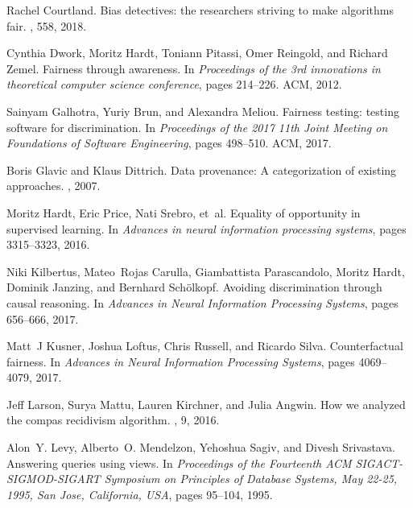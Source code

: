 Rachel Courtland.
\newblock Bias detectives: the researchers striving to make algorithms fair.
, 558, 2018.

Cynthia Dwork, Moritz Hardt, Toniann Pitassi, Omer Reingold, and Richard Zemel.
\newblock Fairness through awareness.
\newblock In {\em Proceedings of the 3rd innovations in theoretical computer
  science conference}, pages 214--226. ACM, 2012.

Sainyam Galhotra, Yuriy Brun, and Alexandra Meliou.
\newblock Fairness testing: testing software for discrimination.
\newblock In {\em Proceedings of the 2017 11th Joint Meeting on Foundations of
  Software Engineering}, pages 498--510. ACM, 2017.

Boris Glavic and Klaus Dittrich.
\newblock Data provenance: A categorization of existing approaches.
, 2007.

Moritz Hardt, Eric Price, Nati Srebro, et~al.
\newblock Equality of opportunity in supervised learning.
\newblock In {\em Advances in neural information processing systems}, pages
  3315--3323, 2016.

Niki Kilbertus, Mateo~Rojas Carulla, Giambattista Parascandolo, Moritz Hardt,
  Dominik Janzing, and Bernhard Sch{\"o}lkopf.
\newblock Avoiding discrimination through causal reasoning.
\newblock In {\em Advances in Neural Information Processing Systems}, pages
  656--666, 2017.

Matt~J Kusner, Joshua Loftus, Chris Russell, and Ricardo Silva.
\newblock Counterfactual fairness.
\newblock In {\em Advances in Neural Information Processing Systems}, pages
  4069--4079, 2017.

Jeff Larson, Surya Mattu, Lauren Kirchner, and Julia Angwin.
\newblock How we analyzed the compas recidivism algorithm.
, 9, 2016.

Alon~Y. Levy, Alberto~O. Mendelzon, Yehoshua Sagiv, and Divesh Srivastava.
\newblock Answering queries using views.
\newblock In {\em Proceedings of the Fourteenth {ACM} {SIGACT-SIGMOD-SIGART}
  Symposium on Principles of Database Systems, May 22-25, 1995, San Jose,
  California, {USA}}, pages 95--104, 1995.

